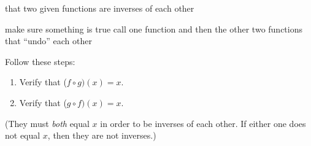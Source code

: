 \documentclass[fleqn,letterpaper,12pt,printwatermark=false]{memoir}
\begin{document}
\newcommand{\myClassName}{Pre-AP Algebra 2}
\newcommand{\myUnitNumber}{1}
\newcommand{\myUnitTitle}{Introduction to Functions}
\newcommand{\myLessonNumber}{11}
\newcommand{\myLessonTitle}{Verifying Inverses}



\pagestyle{myPagestyle}

\checkandfixthelayout
{}

\begin{myNotesHeader}
    \item {} that two given functions are inverses of each other
\end{myNotesHeader}

\begin{myVocabulary}
        {
            make sure something is true
        }
        {
            call one function and then the other
        }
        {
            two functions that ``undo'' each other
        }
\end{myVocabulary}

\begin{myKeyConcepts}
    Follow these steps:
    \begin{enumerate}
        \item Verify that ($f \circ g)(x) = x$.
        \item Verify that ($g \circ f)(x) = x$.
    \end{enumerate}
    (They must \emph{both} equal $x$ in order to be inverses of each other.
    If either one does not equal $x$, then they are not inverses.)
\end{myKeyConcepts}



  
\end{document}
